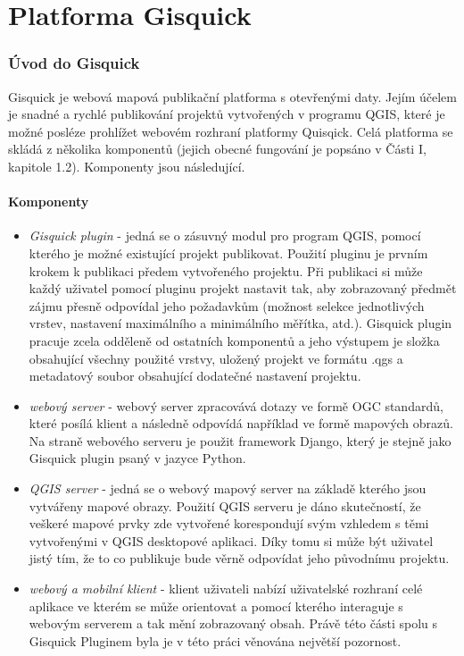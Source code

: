 \newpage
\part{Platforma Gisquick}
\newpage

\section{Úvod do Gisquick}

Gisquick je webová mapová publikační platforma s otevřenými
daty. Jejím účelem je snadné a rychlé publikování projektů vytvořených
v programu QGIS, které je možné posléze prohlížet webovém rozhraní
platformy Quisqick.  Celá platforma se skládá z několika komponentů
(jejich obecné fungování je popsáno v Části I, kapitole
1.2). Komponenty jsou následující.

\subsection{Komponenty}

\begin{itemize}
	\item\textit{Gisquick plugin} - jedná se o zásuvný modul pro
	program QGIS, pomocí kterého je možné existující projekt
	publikovat. Použití pluginu je prvním krokem k publikaci
	předem vytvořeného projektu. Při publikaci si může každý
	uživatel pomocí pluginu projekt nastavit tak, aby zobrazovaný
	předmět zájmu přesně odpovídal jeho požadavkům (možnost
	selekce jednotlivých vrstev, nastavení maximálního a
	minimálního měřítka, atd.). Gisquick plugin pracuje zcela
	odděleně od ostatních komponentů a jeho výstupem je složka
	obsahující všechny použité vrstvy, uložený projekt ve formátu
	.qgs a metadatový soubor obsahující dodatečné nastavení
	projektu.  \item\textit{webový server} - webový server
	zpracovává dotazy ve formě OGC standardů, které posílá klient
	a následně odpovídá například ve formě mapových obrazů. Na
	straně webového serveru je použit framework Django, který je
	stejně jako Gisquick plugin psaný v jazyce
	Python.  \item\textit{QGIS server} - jedná se o webový mapový
	server na základě kterého jsou vytvářeny mapové
	obrazy. Použití QGIS serveru je dáno skutečností, že veškeré
	mapové prvky zde vytvořené korespondují svým vzhledem s těmi
	vytvořenými v QGIS desktopové aplikaci. Díky tomu si může být
	uživatel jistý tím, že to co publikuje bude věrně odpovídat
	jeho původnímu projektu.  \item\textit{webový a mobilní
	klient} - klient uživateli nabízí uživatelské rozhraní celé
	aplikace ve kterém se může orientovat a pomocí kterého
	interaguje s webovým serverem a tak mění zobrazovaný
	obsah. Právě této části spolu s Gisquick Pluginem byla je v
	této práci věnována největší pozornost.
\end{itemize}

